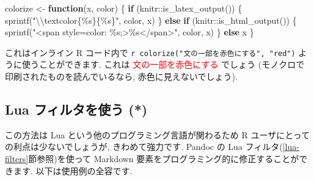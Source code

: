 \documentclass[
  11pt,
]{bxjsreport}
\newenvironment{Shaded}{\begin{snugshade}}{\end{snugshade}}
\newcommand{\ControlFlowTok}[1]{\textcolor[rgb]{0.13,0.29,0.53}{\textbf{#1}}}
\newcommand{\FunctionTok}[1]{\textcolor[rgb]{0.00,0.00,0.00}{#1}}
\newcommand{\NormalTok}[1]{#1}
\newcommand{\OtherTok}[1]{\textcolor[rgb]{0.56,0.35,0.01}{#1}}
\newcommand{\SpecialCharTok}[1]{\textcolor[rgb]{0.00,0.00,0.00}{#1}}
\newcommand{\StringTok}[1]{\textcolor[rgb]{0.31,0.60,0.02}{#1}}
\begin{document}
\begin{Shaded}
\begin{Highlighting}[numbers=left,,]
\NormalTok{colorize }\OtherTok{\textless{}{-}} \ControlFlowTok{function}\NormalTok{(x, color) \{}
  \ControlFlowTok{if}\NormalTok{ (knitr}\SpecialCharTok{::}\FunctionTok{is\_latex\_output}\NormalTok{()) \{}
    \FunctionTok{sprintf}\NormalTok{(}\StringTok{"}\SpecialCharTok{\textbackslash{}\textbackslash{}}\StringTok{textcolor\{\%s\}\{\%s\}"}\NormalTok{, color, x)}
\NormalTok{  \} }\ControlFlowTok{else} \ControlFlowTok{if}\NormalTok{ (knitr}\SpecialCharTok{::}\FunctionTok{is\_html\_output}\NormalTok{()) \{}
    \FunctionTok{sprintf}\NormalTok{(}\StringTok{"\textless{}span style=\textquotesingle{}color: \%s;\textquotesingle{}\textgreater{}\%s\textless{}/span\textgreater{}"}\NormalTok{, color, }
\NormalTok{      x)}
\NormalTok{  \} }\ControlFlowTok{else}\NormalTok{ x}
\NormalTok{\}}
\end{Highlighting}
\end{Shaded}

これはインライン R コード内で \texttt{\textasciigrave{}r\ colorize("文の一部を赤色にする",\ "red")\textasciigrave{}} ように使うことができます. これは \textcolor{red}{文の一部を赤色にする} でしょう (モノクロで印刷されたものを読んでいるなら, 赤色に見えないでしょう).

\hypertarget{lua-color}{%
\subsection{Lua フィルタを使う (*)}\label{lua-color}}

この方法は Lua という他のプログラミング言語が関わるため R ユーザにとっての利点は少ないでしょうが, きわめて強力です. Pandoc の Lua フィルタ(\ref{lua-filters}節参照)を使って Markdown 要素をプログラミング的に修正することができます. 以下は使用例の全容です.
\end{document}
